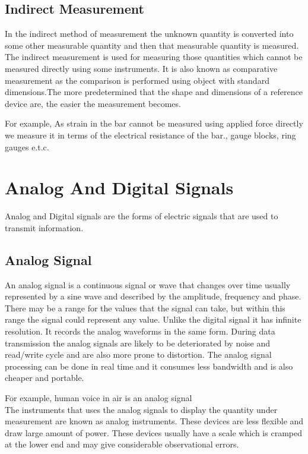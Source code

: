 \documentclass[12pt]{article}
\begin{document}
\subsection{Indirect Measurement}
In the indirect method of measurement the unknown quantity is converted into some other measurable quantity and then that measurable quantity is measured. The indirect measurement is used for measuring those quantities which cannot be measured directly using some instruments. It is also known as comparative measurement as the comparison is performed using object with standard dimensions.The more predetermined that the shape and dimensions of a reference device are, the easier the measurement becomes. 

For example, As strain in the bar cannot be measured using applied force directly we measure it in terms of  the electrical resistance of the bar., gauge blocks, ring gauges e.t.c.

\pagebreak
\section{Analog And Digital Signals}
Analog and Digital signals are the forms of electric signals that are used to transmit information. 

\subsection{Analog Signal}
An analog signal is a continuous signal or wave that changes over time usually represented by a sine wave and described by the amplitude, frequency and phase. There may be a range for the values that the signal can take, but within this range the signal could represent any value. Unlike the digital signal it has infinite resolution. It records the analog waveforms in the same form. During data transmission the analog signals are likely to be deteriorated by noise and read/write cycle and are also more prone to distortion. The analog signal processing can be done in real time and it consumes less bandwidth and is also cheaper and portable. 

For example, human voice in air is an analog signal \\

The instruments that uses the analog signals to display the quantity under measurement are known as analog instruments. These devices are less flexible and draw large amount of power. These devices usually have a scale which is cramped at the lower end and may give considerable observational errors.
\end{document}
